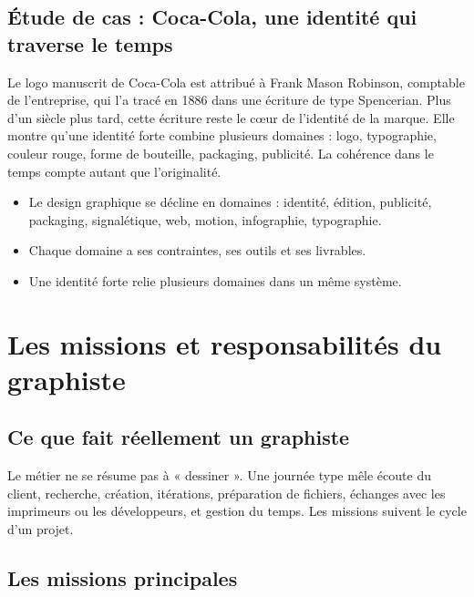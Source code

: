 \subsection{Étude de cas : Coca-Cola, une identité qui traverse le temps}

\begin{defbox}
Le logo manuscrit de Coca-Cola est attribué à Frank Mason Robinson, comptable de l'entreprise, qui l'a tracé en 1886 dans une écriture de type Spencerian. Plus d'un siècle plus tard, cette écriture reste le cœur de l'identité de la marque. Elle montre qu'une identité forte combine plusieurs domaines : logo, typographie, couleur rouge, forme de bouteille, packaging, publicité. La cohérence dans le temps compte autant que l'originalité.
\end{defbox}

\begin{retenir}
\begin{itemize}
    \item Le design graphique se décline en domaines : identité, édition, publicité, packaging, signalétique, web, motion, infographie, typographie.
    \item Chaque domaine a ses contraintes, ses outils et ses livrables.
    \item Une identité forte relie plusieurs domaines dans un même système.
\end{itemize}
\end{retenir}

\section{Les missions et responsabilités du graphiste}

\subsection{Ce que fait réellement un graphiste}

Le métier ne se résume pas à « dessiner ». Une journée type mêle écoute du client, recherche, création, itérations, préparation de fichiers, échanges avec les imprimeurs ou les développeurs, et gestion du temps. Les missions suivent le cycle d'un projet.

\subsection{Les missions principales}

